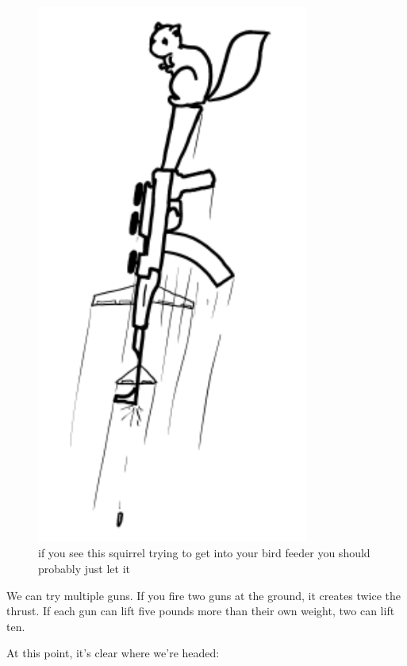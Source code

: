\begin{figure}[!htbp]
\centering
\includegraphics[scale=0.5, max width=0.8\textwidth]{imgs/a/21/jetpack_squirrel.png}
\caption{if you see this squirrel trying to get into your bird feeder you should probably just let it}
\end{figure}

{We can try multiple guns. If you fire two guns at the ground, it creates twice the thrust. If each gun can lift five pounds more than their own weight, two can lift ten.}

{At this point, it’s clear where we’re headed:}

